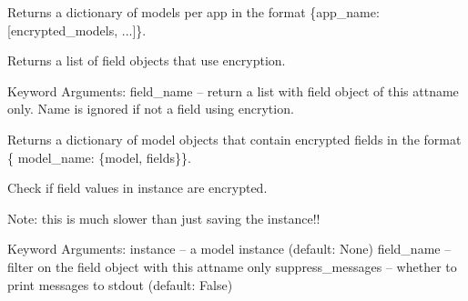 \documentclass[letterpaper,10pt,english]{sphinxmanual}
\begin{document}
\begin{fulllineitems}
\begin{fulllineitems}
\end{fulllineitems}


\begin{fulllineitems}
\label{base_classes:bhp_crypto.classes.ModelCryptor.get_all_encrypted_models}
Returns a dictionary of models per app in the format \{app\_name: {[}encrypted\_models, ...{]}\}.

\end{fulllineitems}


\begin{fulllineitems}
\label{base_classes:bhp_crypto.classes.ModelCryptor.get_encrypted_fields}
Returns a list of field objects that use encryption.

Keyword Arguments:
field\_name -- return a list with field object of this attname only. Name is ignored if not a field using encrytion.

\end{fulllineitems}


\begin{fulllineitems}
\label{base_classes:bhp_crypto.classes.ModelCryptor.get_encrypted_models}
Returns a dictionary of model objects that contain encrypted fields
in the format \{ model\_name: \{model, fields\}\}.

\end{fulllineitems}


\begin{fulllineitems}
\label{base_classes:bhp_crypto.classes.ModelCryptor.is_instance_encrypted}
Check if field values in instance are encrypted.

Note: this is much slower than just saving the instance!!

Keyword Arguments:
instance -- a model instance (default: None)
field\_name -- filter on the field object with this attname only
suppress\_messages -- whether to print messages to stdout (default: False)


\end{fulllineitems}
\end{fulllineitems}
\end{document}
